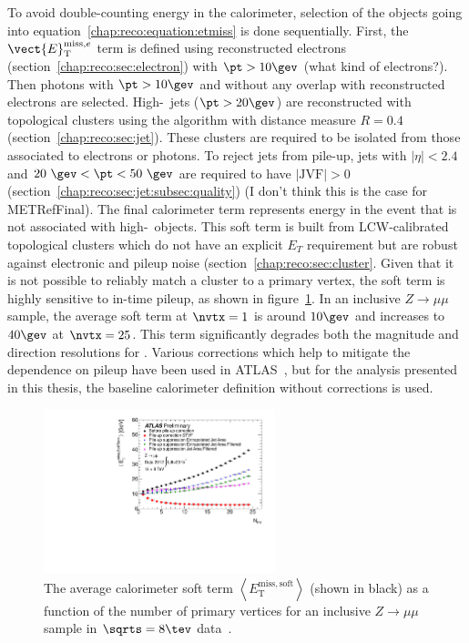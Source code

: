 \noindent
To avoid double-counting energy in the calorimeter, selection of the
objects going into equation~\ref{chap:reco:equation:etmiss} is done
sequentially. First, the
$\vect{\ensuremath{E}}_{\mathrm{T}}^{\mathrm{miss},e}$ term is defined
using reconstructed electrons (section~\ref{chap:reco:sec:electron})
with $\pt > 10 \gev$ (what kind of electrons?). Then photons with $\pt
> 10 \gev$ and without any overlap with reconstructed electrons are
selected. High-\pt~jets ($\pt > 20 \gev$) are reconstructed with
topological clusters using the \antikt algorithm with distance measure
$R=0.4$ (section~\ref{chap:reco:sec:jet}). These clusters are required
to be isolated from those associated to electrons or photons. To reject jets from
pile-up, jets with $|\eta| < 2.4$ and $20~\gev < \pt < 50~\gev$ are
required to have $|\textrm{JVF}| > 0$
(section~\ref{chap:reco:sec:jet:subsec:quality}) (I don't think this
is the case for METRefFinal). The final calorimeter term represents
energy in the event that is not associated with high-\pt~objects. This
soft term is built from LCW-calibrated topological clusters which do
not have an explicit $E_T$ requirement but are robust against
electronic and pileup noise
(section~\ref{chap:reco:sec:cluster}. Given that it is not possible to
reliably match a cluster to a primary vertex, the soft term is highly sensitive
to in-time pileup, as shown in
figure~\ref{chap:reconstruction:fig:softterm_pileup}. In an inclusive
$Z\rightarrow{\mu\mu}$ sample, the average soft term at $\nvtx = 1$ is
around $10 \gev$ and increases to $40 \gev$ at $\nvtx = 25$. This
term significantly degrades both the magnitude and direction
resolutions for \etmiss. Various corrections which help to mitigate
the dependence on pileup have been used in
ATLAS~\cite{bib:ATLAS-CONF-2014-019}, but for the analysis presented
in this thesis, the baseline calorimeter \etmiss definition without
corrections is used. 

\begin{figure}[h]
    \centering
    \includegraphics[width=0.6\textwidth]{fig/reconstruction/cell_out_PU_Zmumu.pdf}
    \caption[]{The average calorimeter \etmiss soft term $\left \langle
      E_{\mathrm{T}}^{\mathrm{miss,soft}} \right \rangle$ (shown in black) as a
      function of the number of primary vertices for an inclusive $Z\rightarrow{\mu\mu}$
      sample in $\sqrts=8 \tev$ data~\cite{bib:ATLAS-CONF-2014-019}.}
\label{chap:reconstruction:fig:softterm_pileup}
\end{figure}

